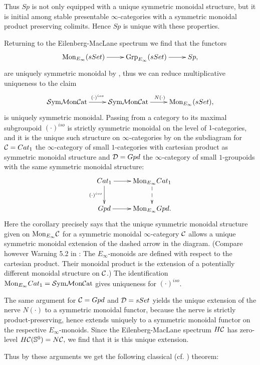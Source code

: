 Thus $Sp$ is not only equipped with a unique symmetric monoidal structure, but
it is initial among stable presentable $\infty$-categories with
a symmetric monoidal product preserving colimits. Hence $Sp$ is unique 
with these properties.

Returning to the Eilenberg-MacLane spectrum we find that the functors
\[\xymatrix{\mathrm{Mon}_{E_\infty}(sSet) \ar[r] & \mathrm{Grp}_{E_\infty}(sSet) 
\ar[r] & Sp,}\] are uniquely symmetric monoidal by \cite[Theorem 5.1]{GGN}, 
thus we can reduce multiplicative uniqueness to the claim \[\xymatrix{\SymMonCat 
\ar[r]^{(\cdot)^{iso}} &\SymMonCat \ar[r]^{N(\cdot)} & 
\mathrm{Mon}_{E_\infty}(sSet),}\] is uniquely symmetric monoidal. Passing
from a category to its maximal subgroupoid $(\cdot)^{iso}$ is 
strictly symmetric monoidal on the level of $1$-categories, and it is the unique 
such structure on $\infty$-categories by \cite[Corollary 5.5 (i)]{GGN} 
on the subdiagram for $\mathcal{C} = Cat_1$ the $\infty$-category of small $1$-categories 
with cartesian product as symmetric monoidal structure and $\mathcal{D} = Gpd$ the 
$\infty$-category of small $1$-groupoids with the same symmetric monoidal structure:
\[\xymatrix{Cat_1\ar[d]_{(\cdot)^{iso}}\ar[r] & \mathrm{Mon}_{E_\infty}Cat_1
\ar@{-->}[d]\\Gpd \ar[r] & \mathrm{Mon}_{E_\infty}Gpd.}\]
Here the corollary precisely says that the unique symmetric monoidal structure
given on $\mathrm{Mon}_{E_\infty}\mathcal{C}$ for a symmetric monoidal $\infty$-category
$\mathcal{C}$ allows a unique symmetric monoidal extension of the dashed arrow in the diagram.
(Compare however Warning 5.2 in \cite{GGN}: The $E_\infty$-monoids are defined
with respect to the cartesian product. Their monoidal 
product is the extension of a potentially different monoidal structure on $\mathcal{C}$.)
The identification $\mathrm{Mon}_{E_\infty}Cat_1 = \mathcal{S}\mathrm{ym}\mathcal{M}\mathrm{on}\mathcal{C}\mathrm{at}$ gives uniqueness
for $(\cdot)^{iso}$.

The same argument for $\mathcal{C} = Gpd$ and $\mathcal{D}=sSet$ yields the unique extension of the
nerve $N(\cdot)$ to a symmetric monoidal functor, because the nerve is strictly
product-preserving, hence extends uniquely to a symmetric monoidal functor on
the respective $E_\infty$-monoids. Since the Eilenberg-MacLane spectrum $H\mathcal{C}$ has
zero-level $H\mathcal{C}(\mathbb{S}^0)=N\mathcal{C},$ we find that it is this unique extension.

Thus by these arguments we get the following classical (cf. \cite{MT1978}) theorem:
{}

